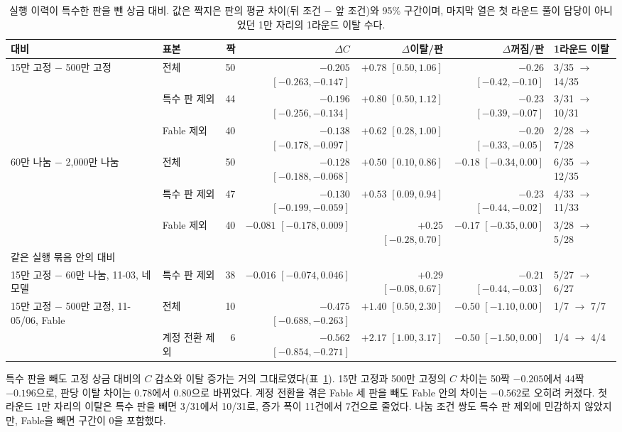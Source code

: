 \begin{table}[h]
\centering
\caption{실행 이력이 특수한 판을 뺀 상금 대비. 값은 짝지은 판의 평균 차이(뒤 조건 $-$ 앞 조건)와 95\% 구간이며, 마지막 열은 첫 라운드 풀이 담당이 아니었던 1만 자리의 1라운드 이탈 수다.}
\label{val:w6-tab}
\small
\setlength{\tabcolsep}{4pt}
\begin{tabular}{llrrrrl}
\toprule
대비 & 표본 & 짝 & $\Delta C$ & $\Delta$이탈/판 & $\Delta$꺼짐/판 & 1라운드 이탈 \\
\midrule
15만 고정 $-$ 500만 고정 & 전체 & 50 & $-0.205$ $[-0.263, -0.147]$ & $+0.78$ $[0.50, 1.06]$ & $-0.26$ $[-0.42, -0.10]$ & 3/35 $\to$ 14/35 \\
 & 특수 판 제외 & 44 & $-0.196$ $[-0.256, -0.134]$ & $+0.80$ $[0.50, 1.12]$ & $-0.23$ $[-0.39, -0.07]$ & 3/31 $\to$ 10/31 \\
 & Fable 제외 & 40 & $-0.138$ $[-0.178, -0.097]$ & $+0.62$ $[0.28, 1.00]$ & $-0.20$ $[-0.33, -0.05]$ & 2/28 $\to$ 7/28 \\
60만 나눔 $-$ 2,000만 나눔 & 전체 & 50 & $-0.128$ $[-0.188, -0.068]$ & $+0.50$ $[0.10, 0.86]$ & $-0.18$ $[-0.34, 0.00]$ & 6/35 $\to$ 12/35 \\
 & 특수 판 제외 & 47 & $-0.130$ $[-0.199, -0.059]$ & $+0.53$ $[0.09, 0.94]$ & $-0.23$ $[-0.44, -0.02]$ & 4/33 $\to$ 11/33 \\
 & Fable 제외 & 40 & $-0.081$ $[-0.178, 0.009]$ & $+0.25$ $[-0.28, 0.70]$ & $-0.17$ $[-0.35, 0.00]$ & 3/28 $\to$ 5/28 \\
\midrule
\multicolumn{7}{l}{같은 실행 묶음 안의 대비} \\
15만 고정 $-$ 60만 나눔, 11-03, 네 모델 & 특수 판 제외 & 38 & $-0.016$ $[-0.074, 0.046]$ & $+0.29$ $[-0.08, 0.67]$ & $-0.21$ $[-0.44, -0.03]$ & 5/27 $\to$ 6/27 \\
15만 고정 $-$ 500만 고정, 11-05/06, Fable & 전체 & 10 & $-0.475$ $[-0.688, -0.263]$ & $+1.40$ $[0.50, 2.30]$ & $-0.50$ $[-1.10, 0.00]$ & 1/7 $\to$ 7/7 \\
 & 계정 전환 제외 & 6 & $-0.562$ $[-0.854, -0.271]$ & $+2.17$ $[1.00, 3.17]$ & $-0.50$ $[-1.50, 0.00]$ & 1/4 $\to$ 4/4 \\
\bottomrule
\end{tabular}
\end{table}

특수 판을 빼도 고정 상금 대비의 $C$ 감소와 이탈 증가는 거의 그대로였다(표~\ref{val:w6-tab}). 15만 고정과 500만 고정의 $C$ 차이는 50짝 $-0.205$에서 44짝 $-0.196$으로, 판당 이탈 차이는 0.78에서 0.80으로 바뀌었다. 계정 전환을 겪은 Fable 세 판을 빼도 Fable 안의 차이는 $-0.562$로 오히려 커졌다. 첫 라운드 1만 자리의 이탈은 특수 판을 빼면 3/31에서 10/31로, 증가 폭이 11건에서 7건으로 줄었다. 나눔 조건 쌍도 특수 판 제외에 민감하지 않았지만, Fable을 빼면 구간이 0을 포함했다.

